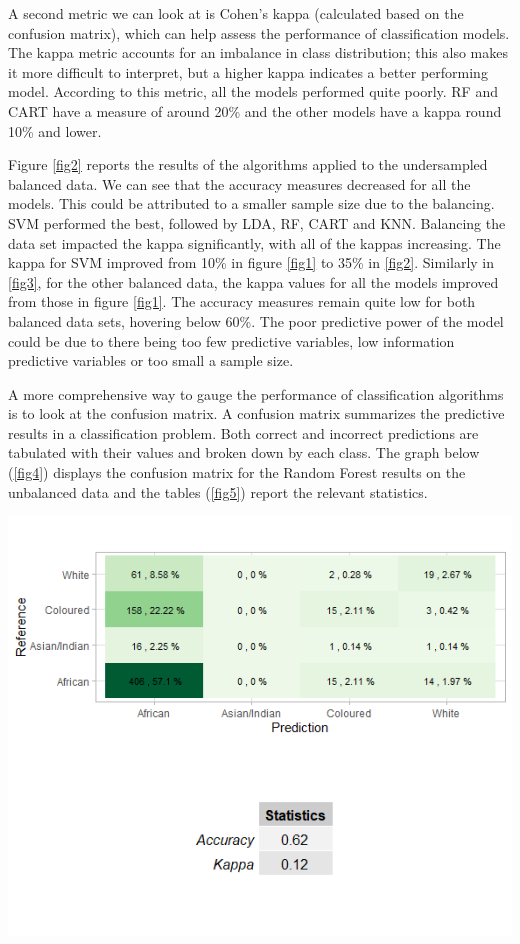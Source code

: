 \documentclass[11pt,preprint, authoryear]{elsarticle}
\let\origfigure\figure
\let\endorigfigure\endfigure
\renewenvironment{figure}[1][2] {
    \expandafter\origfigure\expandafter[H]
} {
    \endorigfigure
}
\numberwithin{equation}{section}
\numberwithin{figure}{section}
\numberwithin{table}{section}
\begin{document}
A second metric we can look at is Cohen's kappa (calculated based on the
confusion matrix), which can help assess the performance of
classification models. The kappa metric accounts for an imbalance in
class distribution; this also makes it more difficult to interpret, but
a higher kappa indicates a better performing model. According to this
metric, all the models performed quite poorly. RF and CART have a
measure of around 20\% and the other models have a kappa round 10\% and
lower.

Figure \ref{fig2} reports the results of the algorithms applied to the
undersampled balanced data. We can see that the accuracy measures
decreased for all the models. This could be attributed to a smaller
sample size due to the balancing. SVM performed the best, followed by
LDA, RF, CART and KNN. Balancing the data set impacted the kappa
significantly, with all of the kappas increasing. The kappa for SVM
improved from 10\% in figure \ref{fig1} to 35\% in \ref{fig2}. Similarly
in \ref{fig3}, for the other balanced data, the kappa values for all the
models improved from those in figure \ref{fig1}. The accuracy measures
remain quite low for both balanced data sets, hovering below 60\%. The
poor predictive power of the model could be due to there being too few
predictive variables, low information predictive variables or too small
a sample size.

A more comprehensive way to gauge the performance of classification
algorithms is to look at the confusion matrix. A confusion matrix
summarizes the predictive results in a classification problem. Both
correct and incorrect predictions are tabulated with their values and
broken down by each class. The graph below (\ref{fig4}) displays the
confusion matrix for the Random Forest results on the unbalanced data
and the tables (\ref{fig5}) report the relevant statistics.

\begin{figure}[htbp]
\centering
\includegraphics{images/cmrf.png}
\caption{Random Forest Confusion Matrix \label{fig4}}
\end{figure}
\end{document}

